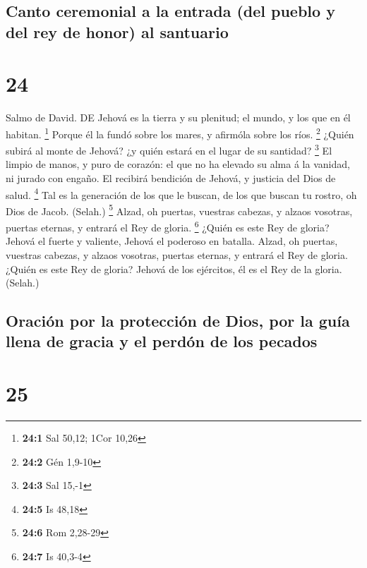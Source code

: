\hypertarget{canto-ceremonial-a-la-entrada-del-pueblo-y-del-rey-de-honor-al-santuario}{%
\subsection{Canto ceremonial a la entrada (del pueblo y del rey de
honor) al
santuario}\label{canto-ceremonial-a-la-entrada-del-pueblo-y-del-rey-de-honor-al-santuario}}

\hypertarget{section-23}{%
\section{24}\label{section-23}}

 Salmo de David. DE Jehová es la tierra y su plenitud; el
mundo, y los que en él habitan. \footnote{\textbf{24:1} Sal 50,12; 1Cor
  10,26}  Porque él la fundó sobre los mares, y afirmóla
sobre los ríos. \footnote{\textbf{24:2} Gén 1,9-10}  ¿Quién
subirá al monte de Jehová? ¿y quién estará en el lugar de su santidad?
\footnote{\textbf{24:3} Sal 15,-1}  El limpio de manos, y
puro de corazón: el que no ha elevado su alma á la vanidad, ni jurado
con engaño.  El recibirá bendición de Jehová, y justicia del
Dios de salud. \footnote{\textbf{24:5} Is 48,18}  Tal es la
generación de los que le buscan, de los que buscan tu rostro, oh Dios de
Jacob. (Selah.) \footnote{\textbf{24:6} Rom 2,28-29}  Alzad,
oh puertas, vuestras cabezas, y alzaos vosotras, puertas eternas, y
entrará el Rey de gloria. \footnote{\textbf{24:7} Is 40,3-4}
 ¿Quién es este Rey de gloria? Jehová el fuerte y valiente,
Jehová el poderoso en batalla.  Alzad, oh puertas, vuestras
cabezas, y alzaos vosotras, puertas eternas, y entrará el Rey de gloria.
 ¿Quién es este Rey de gloria? Jehová de los ejércitos, él
es el Rey de la gloria. (Selah.)

\hypertarget{oraciuxf3n-por-la-protecciuxf3n-de-dios-por-la-guuxeda-llena-de-gracia-y-el-perduxf3n-de-los-pecados}{%
\subsection{Oración por la protección de Dios, por la guía llena de
gracia y el perdón de los
pecados}\label{oraciuxf3n-por-la-protecciuxf3n-de-dios-por-la-guuxeda-llena-de-gracia-y-el-perduxf3n-de-los-pecados}}

\hypertarget{section-24}{%
\section{25}\label{section-24}}

